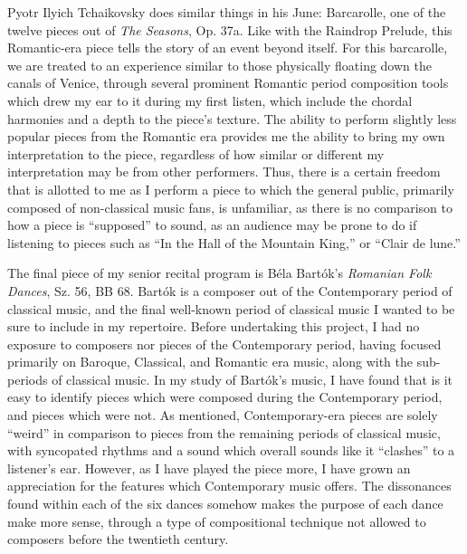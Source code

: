 Pyotr Ilyich Tchaikovsky does similar things in his June: Barcarolle, one of the twelve pieces out of \textit{The Seasons}, Op. 37a. Like with the Raindrop Prelude, this Romantic-era piece tells the story of an event beyond itself. For this barcarolle, we are treated to an experience similar to those physically floating down the canals of Venice, through several prominent Romantic period composition tools which drew my ear to it during my first listen, which include the chordal harmonies and a depth to the piece's texture. The ability to perform slightly less popular pieces from the Romantic era provides me the ability to bring my own interpretation to the piece, regardless of how similar or different my interpretation may be from other performers. Thus, there is a certain freedom that is allotted to me as I perform a piece to which the general public, primarily composed of non-classical music fans, is unfamiliar, as there is no comparison to how a piece is ``supposed'' to sound, as an audience may be prone to do if listening to pieces such as ``In the Hall of the Mountain King,'' or ``Clair de lune.''

The final piece of my senior recital program is Béla Bartók's \textit{Romanian Folk Dances}, Sz. 56, BB 68. Bartók is a composer out of the Contemporary period of classical music, and the final well-known period of classical music I wanted to be sure to include in my repertoire. Before undertaking this project, I had no exposure to composers nor pieces of the Contemporary period, having focused primarily on Baroque, Classical, and Romantic era music, along with the sub-periods of classical music. In my study of Bartók's music, I have found that is it easy to identify pieces which were composed during the Contemporary period, and pieces which were not. As mentioned, Contemporary-era pieces are solely ``weird'' in comparison to pieces from the remaining periods of classical music, with syncopated rhythms and a sound which overall sounds like it ``clashes'' to a listener's ear. However, as I have played the piece more, I have grown an appreciation for the features which Contemporary music offers. The dissonances found within each of the six dances somehow makes the purpose of each dance make more sense, through a type of compositional technique not allowed to composers before the twentieth century. 